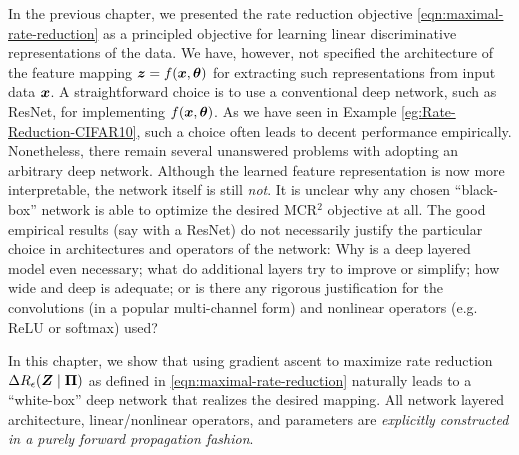 \documentclass[../../book-main.tex]{subfiles}
\begin{document}
In the previous chapter, we presented the rate reduction objective \eqref{eqn:maximal-rate-reduction} as a principled objective for learning linear discriminative representations of the data. We have, however, not specified the architecture of the feature mapping $\bm{z} = f(\bm{x}, \bm \theta)$ for extracting such representations from input data $\bm{x}$. 
A straightforward choice is to use a conventional deep network, such as ResNet, for implementing $f(\bm{x}, \bm \theta)$. As we have seen in Example \ref{eg:Rate-Reduction-CIFAR10}, such a choice often leads to decent performance empirically. Nonetheless, there remain several unanswered problems with adopting an arbitrary deep network. Although the learned feature representation is now more interpretable, the network itself is still {\em not}. It is unclear why any chosen ``black-box'' network is able to optimize the desired MCR$^2$ objective at all. The good empirical results (say with a ResNet) do not necessarily justify the particular choice in architectures and operators of the network: Why is a deep layered model even necessary; what do additional layers try to improve or simplify; how wide and deep is adequate; or is there any rigorous justification for the convolutions (in a popular multi-channel form) and nonlinear operators (e.g. ReLU or softmax) used? 

In this chapter, we show that using gradient ascent to maximize rate reduction $\Delta R_{\epsilon}(\bm{Z} \mid \bm \Pi)$ as defined in \eqref{eqn:maximal-rate-reduction} naturally leads to a ``white-box'' deep network that realizes the desired mapping. All network layered architecture, linear/nonlinear operators, and parameters are {\em explicitly constructed in a purely forward propagation fashion}. 
\end{document}
